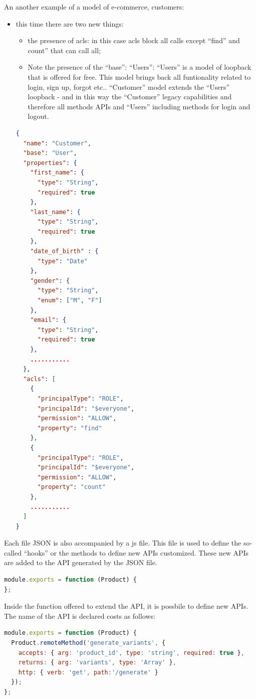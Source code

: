 An another example of a model of e-commerce, customers:
\begin{itemize}
\item this time there are two new things:
\begin{itemize}
\item the presence of acls: in this case acls block all calls except “find” and count” that can call all;
\item Note the presence of the “base”: “Users”: “Users” is a model of loopback that is offered for free. This model brings back all funtionality related to login, sign up, forgot etc.. “Customer” model extends the “Users” loopback - and in this way the “Customer” legacy capabilities and therefore all methods APIs and “Users” including methods for login and logout.
\end{itemize}
\begin{lstlisting}[language=json]
{
  "name": "Customer",
  "base": "User",
  "properties": {
    "first_name": {
      "type": "String",
      "required": true
    },
    "last_name": {
      "type": "String",
      "required": true
    },
    "date_of_birth" : {
      "type": "Date"
    },
    "gender": {
      "type": "String",
      "enum": ["M", "F"]
    },
    "email": {
      "type": "String",
      "required": true
    },
    ...........
  },
  "acls": [
    {
      "principalType": "ROLE",
      "principalId": "$everyone",
      "permission": "ALLOW",
      "property": "find"
    },
    {
      "principalType": "ROLE",
      "principalId": "$everyone",
      "permission": "ALLOW",
      "property": "count"
    },
    ...........
  ]
}
\end{lstlisting}
\end{itemize}
Each file JSON is also accompanied by a js file. This file is used to define the so-called “hooks” or the methods to define new APIs customized. These new APIs are added to the API generated by the JSON file.
\begin{lstlisting}[language=javascript]
module.exports = function (Product) {
};
\end{lstlisting}
Inside the function offered to extend the API, it is possbile to define new APIs. The name of the API is declared costs as follows:
\begin{lstlisting}[language=javascript]
module.exports = function (Product) {
  Product.remoteMethod('generate_variants', {
    accepts: { arg: 'product_id', type: 'string', required: true },
    returns: { arg: 'variants', type: 'Array' },
    http: { verb: 'get', path:'/generate' }
  });
};
\end{lstlisting}
